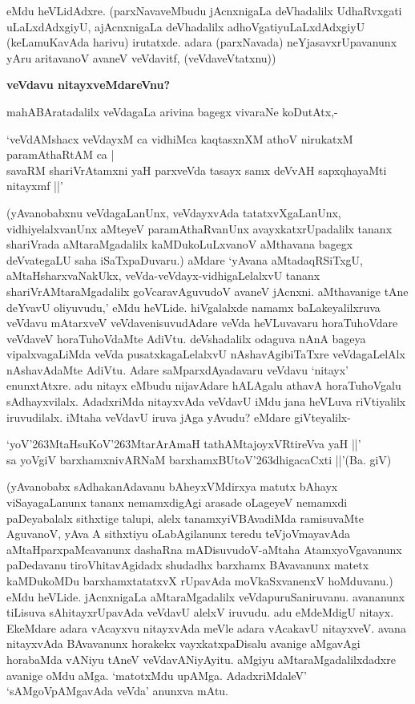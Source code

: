 \noindent
eMdu heVLidAdxre. (parxNavaveMbudu jAcnxnigaLa deVhadalilx UdhaRvxgati uLaLxdAdx\-giyU, ajAcnxnigaLa deVhadalilx adhoVgatiyuLaLxdAdxgiyU (keLamuKavAda harivu) irutatxde. adara (parxNavada) neYjasavxrUpa\-vanunx yAru aritavanoV avaneV veVdavitf, (veVdaveVtatxnu))

{\bigskip
\noindent
{\large\bf veVdavu nitayxveMdareVnu?}}\label{page133}
\medskip

\noindent
mahABAratadalilx veVdagaLa arivina bagegx vivaraNe koDutAtx,-

\begin{shloka}
`veVdAMshacx veVdayxM ca vidhiMca kaqtasxnXM athoV nirukatxM paramAthaRtAM ca |\\\label{133}
savaRM shariVrAtamxni yaH parxveVda tasayx samx deVvAH sapxqhayaMti nitayxmf ||'
\end{shloka}

\noindent
(yAvanobabxnu veVdagaLanUnx, veVdayxvAda tatatxvXgaLanUnx, vidhiyelalxvanUnx aMteyeV paramAthaR\-vanUnx avayxkatxrUpadalilx tananx shariVrada aMtaraMgadalilx kaMDukoLuLxvanoV aMthavana bagegx deVvate\-gaLU saha iSaTxpaDuvaru.) aMdare `yAvana aMtadaqRSiTxgU, aMtaHsharxvaNakUkx, veVda-veVdayx-vidhigaLe\-lalxvU tananx shariVrAMtaraMgadalilx goVcaravAguvudoV avaneV jAcnxni. aMthavanige tAne deYvavU oliyu\-vudu,' eMdu heVLide. hiVgalalxde namamx baLakeyalilxruva veVdavu mAtarxveV veVdavenisuvudAdare veVda heVLu\-vavaru horaTuhoVdare veVdaveV horaTuhoVdaMte AdiVtu. deVshadalilx odaguva nAnA bageya vipalxvagaLiMda veVda pusatxkagaLelalxvU nAshavAgibiTaTxre veVdagaLelAlx nAshavAdaMte AdiVtu. Adare saMparx\-dAya\-davaru veVdavu `nitayx' enunxtAtxre. adu nitayx eMbudu nijavAdare hALAgalu athavA horaTu\-hoVgalu sAdhayxvilalx. AdadxriMda nitayxvAda veVdavU iMdu jana heVLuva riVtiyalilx iruvu\-dilalx. iMtaha veVdavU iruva jAga yAvudu? eMdare giVteyalilx-

\begin{shloka}
`yoV\char'263MtaHsuKoV\char'263MtarArAmaH tathAMtajoyxVRtireVva yaH ||'\\\label{134}
sa yoVgiV barxhamxnivARNaM barxhamxBUtoV\char'263dhigacaCxti ||'\hfill{(Ba. giV)}
\end{shloka}

\noindent
(yAvanobabx sAdhakanAdavanu bAheyxVMdirxya matutx bAhayx viSayagaLanunx tananx nemamxdigAgi ara\-sade oLageyeV nemamxdi paDeyabalalx sithxtige talupi, alelx tanamxyiVBAvadiMda ramisuvaMte AguvanoV, yAva A sithxtiyu oLabAgilanunx teredu teVjoVmayavAda aMtaHparxpaMcavanunx dashaRna mADisu\-vudoV-aMtaha AtamxyoVgavanunx paDedavanu tiroVhitavAgidadx shudadhx barxhamx BAvavanunx matetx kaMDu\-koMDu barxhamxtatatxvX rUpavAda moVkaSxvanenxV hoMduvanu.) eMdu heVLide. jAcnxnigaLa aMtaraMga\-dalilx veVda\-puruSaniruvanu. avananunx tiLisuva sAhitayxrUpavAda veVdavU alelxV iruvudu. adu eMdeM\-digU nitayx. EkeMdare adara vAcayxvu nitayxvAda meVle adara vAcakavU nitayxveV. avana nitayxvAda BAva\-vanunx \-horakekx vayxkatx\-paDi\-salu avanige aMgavAgi horabaMda vANiyu tAneV veVdavANiyAyitu. aMgiyu aMtaraMga\-dalilxdadxre avanige oMdu aMga. `matotxMdu upAMga. AdadxriMdaleV' `sAMgoV\-pAMgavAda veVda' anunxva mAtu.

